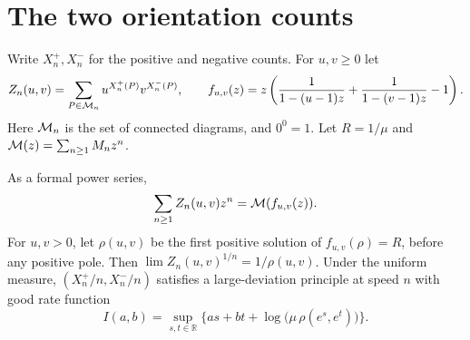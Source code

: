 \section{The two orientation counts}
\label{sec:joint}
Write \(X_n^+,X_n^-\) for the positive and negative counts. For \(u,v\ge0\) let
\[
 Z_n(u,v)=\sum_{P\in\mathcal M_n}u^{X_n^+(P)}v^{X_n^-(P)},\qquad
 f_{u,v}(z)=z\left(\frac1{1-(u-1)z}+
                        \frac1{1-(v-1)z}-1\right).
\]
Here \(\mathcal M_n\) is the set of connected diagrams, and \(0^0=1\).
Let \(R=1/\mu\) and \(\mathcal M(z)=\sum_{n\ge1}M_nz^n\).

\begin{theorem}\label{thm:joint}
As a formal power series,
\[
             \sum_{n\ge1} Z_n(u,v)z^n=\mathcal M(f_{u,v}(z)).
\]
For \(u,v>0\), let \(\rho(u,v)\) be the first positive solution of
\(f_{u,v}(\rho)=R\), before any positive pole. Then
\(\lim Z_n(u,v)^{1/n}=1/\rho(u,v)\). Under the uniform measure,
\((X_n^+/n,X_n^-/n)\) satisfies a large-deviation principle at speed \(n\)
with good rate function
\[
 I(a,b)=\sup_{s,t\in\mathbb R}
       \bigl\{as+bt+\log\bigl(\mu\,\rho(e^s,e^t)\bigr)\bigr\}.
\]
\end{theorem}
